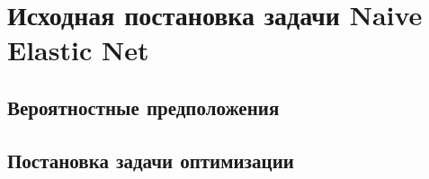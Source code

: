 \documentclass[12pt]{article}
\begin{document}
	\newpage \tableofcontents

	\section{Исходная постановка задачи Naive Elastic Net}
		\subsection{Вероятностные предположения}	
		\subsection{Постановка задачи оптимизации} 	
	
\end{document}
